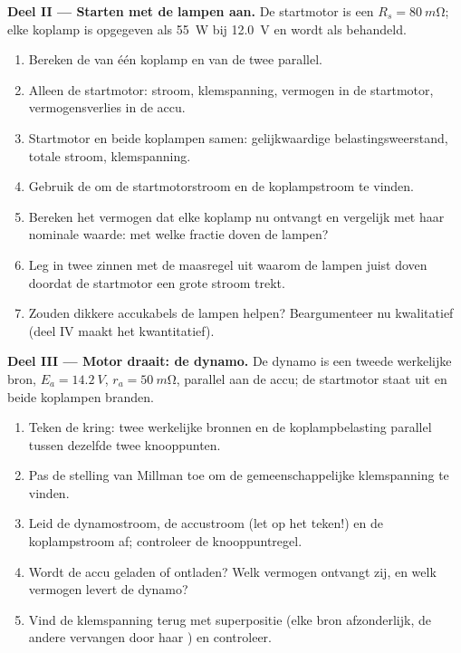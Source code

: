 \begin{problem}
\medskip
\noindent\textbf{Deel II --- Starten met de lampen aan.}
De startmotor is een  $R_s = \qty{80}{m\ohm}$; elke koplamp is
opgegeven als \qty{55}{W} bij \qty{12.0}{V} en wordt als  behandeld.
\begin{enumerate}[resume]
  \item Bereken de  van één koplamp en van de twee
        parallel.
  \item Alleen de startmotor: stroom, klemspanning, vermogen in de startmotor,
        vermogensverlies in de accu.
  \item Startmotor en beide koplampen samen: gelijkwaardige
        belastingsweerstand, totale stroom, klemspanning.
  \item Gebruik de  om de startmotorstroom en de
        koplampstroom te vinden.
  \item Bereken het vermogen dat elke koplamp nu ontvangt en vergelijk met
        haar nominale waarde: met welke fractie doven de lampen?
  \item Leg in twee zinnen met de maasregel uit waarom de lampen juist
        doven doordat de startmotor een grote stroom trekt.
  \item Zouden dikkere accukabels de lampen helpen? Beargumenteer nu
        kwalitatief (deel IV maakt het kwantitatief).
\end{enumerate}

\medskip
\noindent\textbf{Deel III --- Motor draait: de dynamo.}
De dynamo is een tweede werkelijke bron, $E_a = \qty{14.2}{V}$,
$r_a = \qty{50}{m\ohm}$, parallel aan de accu; de startmotor staat
uit en beide koplampen branden.
\begin{enumerate}[resume]
  \item Teken de kring: twee werkelijke bronnen en de koplampbelasting
        parallel tussen dezelfde twee knooppunten.
  \item Pas de stelling van Millman toe om de gemeenschappelijke
        klemspanning te vinden.
  \item Leid de dynamostroom, de accustroom (let op het teken!) en de
        koplampstroom af; controleer de knooppuntregel.
  \item Wordt de accu geladen of ontladen? Welk vermogen ontvangt zij,
        en welk vermogen levert de dynamo?
  \item Vind de klemspanning terug met superpositie (elke bron
        afzonderlijk, de andere vervangen door haar ) en
        controleer.
\end{enumerate}


\end{problem}
